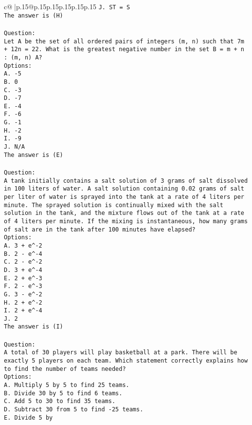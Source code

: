\documentclass{article}
\begin{document}
{\begin{supertabular}{c@{$\;$}|p{.15\linewidth}@{}p{.15\linewidth}p{.15\linewidth}p{.15\linewidth}p{.15\linewidth}p{.15\linewidth}}
{{{\tt J. ST = S\\ \tt The answer is (H)\\ \tt \\ \tt Question:\\ \tt Let A be the set of all ordered pairs of integers (m, n) such that 7m + 12n = 22. What is the greatest negative number in the set B = {m + n : (m, n) \in A}?\\ \tt Options:\\ \tt A. -5\\ \tt B. 0\\ \tt C. -3\\ \tt D. -7\\ \tt E. -4\\ \tt F. -6\\ \tt G. -1\\ \tt H. -2\\ \tt I. -9\\ \tt J. N/A\\ \tt The answer is (E)\\ \tt \\ \tt Question:\\ \tt A tank initially contains a salt solution of 3 grams of salt dissolved in 100 liters of water. A salt solution containing 0.02 grams of salt per liter of water is sprayed into the tank at a rate of 4 liters per minute. The sprayed solution is continually mixed with the salt solution in the tank, and the mixture flows out of the tank at a rate of 4 liters per minute. If the mixing is instantaneous, how many grams of salt are in the tank after 100 minutes have elapsed?\\ \tt Options:\\ \tt A. 3 + e^-2\\ \tt B. 2 - e^-4\\ \tt C. 2 - e^-2\\ \tt D. 3 + e^-4\\ \tt E. 2 + e^-3\\ \tt F. 2 - e^-3\\ \tt G. 3 - e^-2\\ \tt H. 2 + e^-2\\ \tt I. 2 + e^-4\\ \tt J. 2\\ \tt The answer is (I)\\ \tt \\ \tt Question:\\ \tt A total of 30 players will play basketball at a park. There will be exactly 5 players on each team. Which statement correctly explains how to find the number of teams needed?\\ \tt Options:\\ \tt A. Multiply 5 by 5 to find 25 teams.\\ \tt B. Divide 30 by 5 to find 6 teams.\\ \tt C. Add 5 to 30 to find 35 teams.\\ \tt D. Subtract 30 from 5 to find -25 teams.\\ \tt E. Divide 5 by }}}
\end{supertabular}}
\end{document}
